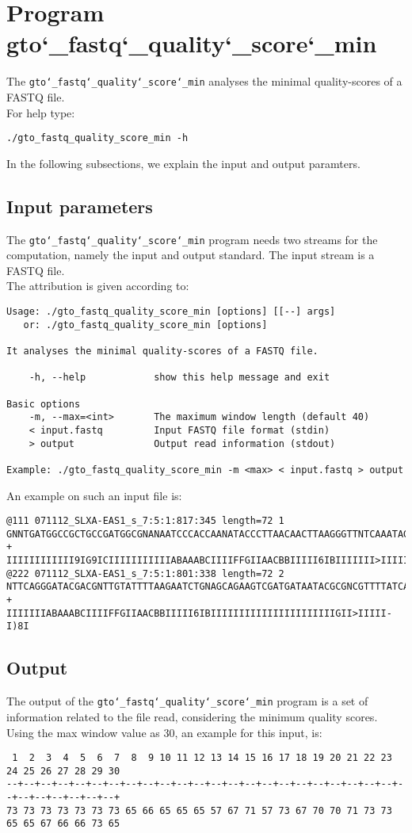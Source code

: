 \section{Program gto\char`_fastq\char`_quality\char`_score\char`_min}
The \texttt{gto\char`_fastq\char`_quality\char`_score\char`_min} analyses the minimal quality-scores of a FASTQ file.\\
For help type:
\begin{lstlisting}
./gto_fastq_quality_score_min -h
\end{lstlisting}
In the following subsections, we explain the input and output paramters.

\subsection*{Input parameters}

The \texttt{gto\char`_fastq\char`_quality\char`_score\char`_min} program needs two streams for the computation, namely the input and output standard. The input stream is a FASTQ file.\\
The attribution is given according to:
\begin{lstlisting}
Usage: ./gto_fastq_quality_score_min [options] [[--] args]
   or: ./gto_fastq_quality_score_min [options]

It analyses the minimal quality-scores of a FASTQ file.

    -h, --help            show this help message and exit

Basic options
    -m, --max=<int>       The maximum window length (default 40)
    < input.fastq         Input FASTQ file format (stdin)
    > output              Output read information (stdout)

Example: ./gto_fastq_quality_score_min -m <max> < input.fastq > output
\end{lstlisting}
An example on such an input file is:
\begin{lstlisting}
@111 071112_SLXA-EAS1_s_7:5:1:817:345 length=72 1
GNNTGATGGCCGCTGCCGATGGCGNANAATCCCACCAANATACCCTTAACAACTTAAGGGTTNTCAAATAGA
+
IIIIIIIIIIII9IG9ICIIIIIIIIIIIABAAABCIIIIFFGIIAACBBIIIII6IBIIIIIII>IIIIII/
@222 071112_SLXA-EAS1_s_7:5:1:801:338 length=72 2
NTTCAGGGATACGACGNTTGTATTTTAAGAATCTGNAGCAGAAGTCGATGATAATACGCGNCGTTTTATCAN
+
IIIIIIIABAAABCIIIIFFGIIAACBBIIIII6IBIIIIIIIIIIIIIIIIIIIIIIGII>IIIII-I)8I
\end{lstlisting}

\subsection*{Output}
The output of the \texttt{gto\char`_fastq\char`_quality\char`_score\char`_min} program is a set of information related to the file read, considering the minimum quality scores.  \\
Using the max window value as 30, an example for this input, is: 
\begin{lstlisting}
 1  2  3  4  5  6  7  8  9 10 11 12 13 14 15 16 17 18 19 20 21 22 23 24 25 26 27 28 29 30 
--+--+--+--+--+--+--+--+--+--+--+--+--+--+--+--+--+--+--+--+--+--+--+--+--+--+--+--+--+--+
73 73 73 73 73 73 73 65 66 65 65 65 57 67 71 57 73 67 70 70 71 73 73 65 65 67 66 66 73 65 
\end{lstlisting}